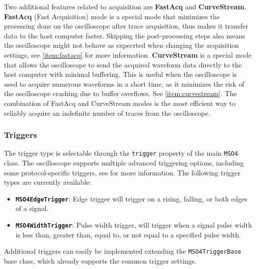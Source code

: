 \documentclass[a4paper,english,twoside,10pt]{article}
\begin{document}
Two additional features related to acquisition are \textbf{FastAcq} and \textbf{CurveStream}. \textbf{FastAcq} (Fast Acquisition) mode is a special mode that minimizes the processing done on the oscilloscope after trace acquisition, thus makes it transfer data to the host computer faster. Skipping the post-processing steps also means the oscilloscope might not behave as expecrted when changing the acquisition settings, see \autoref{item:fastacq} for more information.
\textbf{CurveStream} is a special mode that allows the oscilloscope to send the acquired waveform data directly to the host computer with minimal buffering. This is useful when the oscilloscope is used to acquire numerous waveforms in a short time, as it minimizes the risk of the oscilloscope crashing due to buffer overflows. See \autoref{item:curvestream}.
The combination of FastAcq and CurveStream modes is the most efficient way to reliably acquire an indefinite number of traces from the oscilloscope.

\subsubsection{Triggers}
The trigger type is selectable through the \texttt{trigger} property of the main \texttt{MSO4} class. The oscilloscope supports multiple advanced triggering options, including some protocol-specific triggers, see \cite[p.~159]{tektronix:mso-progman}\cite[p.~121]{tektronix:mso-help} for more information. The following trigger types are currently available:
\begin{itemize}
	\item \textbf{\texttt{MSO4EdgeTrigger}}: Edge trigger will trigger on a rising, falling, or both edges of a signal.
	\item \textbf{\texttt{MSO4WidthTrigger}}: Pulse width trigger, will trigger when a signal pulse width is less than, greater than, equal to, or not equal to a specified pulse width.
\end{itemize}

Additional triggers can easily be implemented extending the \texttt{MSO4TriggerBase} base class, which already supports the common trigger settings.
\end{document}
